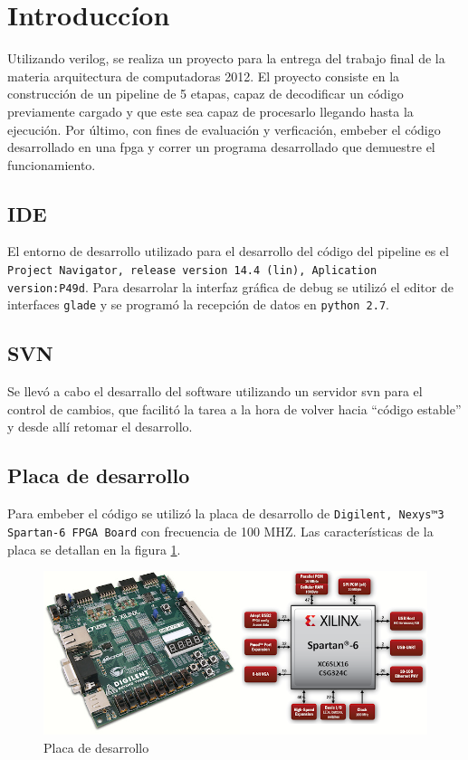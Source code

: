 \newpage
\section{Introducc\'ion}

Utilizando verilog, se realiza un proyecto para la entrega del trabajo final de la materia arquitectura de computadoras 2012. El proyecto consiste en la construcci\'on de un pipeline de 5 etapas, capaz de decodificar un c\'odigo previamente cargado y que este sea capaz de procesarlo llegando hasta la ejecución. Por último, con fines de evaluaci\'on y verficaci\'on, embeber el c\'odigo desarrollado en una fpga y correr un programa desarrollado que demuestre el funcionamiento.

\subsection{IDE}
El entorno de desarrollo utilizado para el desarrollo del c\'odigo del pipeline es el \texttt{Project Navigator, release version 14.4 (lin), Aplication version:P49d}.
Para desarrolar la interfaz gr\'afica de debug se utiliz\'o el editor de interfaces \texttt{glade} y se program\'o la recepci\'on de datos en \texttt{python 2.7}. 

\subsection{SVN}
Se llev\'o a cabo el desarrallo del software utilizando un servidor svn para el control de cambios, que facilit\'o la tarea a la hora de volver hacia ``c\'odigo estable'' y desde all\'i retomar el desarrollo.

\subsection{Placa de desarrollo}
Para embeber el c\'odigo se utiliz\'o la placa de desarrollo de \texttt{Digilent, Nexys™3 Spartan-6 FPGA Board} con frecuencia de 100 MHZ. Las caracter\'isticas de la placa se detallan en la figura \ref{fig:digilent}.
\begin{figure}[H]
\centering
\includegraphics[scale=0.5]{img/digilent}
\caption{Placa de desarrollo}
\label{fig:digilent}
\end{figure} 		 
\newpage		

